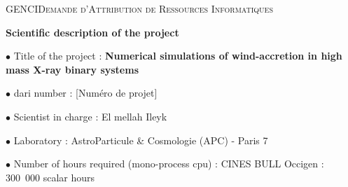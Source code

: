 \documentclass[
    a4paper, 
    12pt, onecolumn,
]{article}
\newcommand{\rubrique}{\bigskip \noindent $\bullet$ }
\begin{document}


 
\noindent GENCI\hfill \textsc{Demande d'Attribution de Ressources Informatiques}

\begin{center}
\Large  \bf
Scientific description of the project
\end{center}
\bigskip

\rubrique Title of the project : {\bf Numerical simulations of wind-accretion in \hspace*{4.42cm} high mass X-ray binary systems}

\rubrique  {\sc dari} number :
\hfill
[Num\'ero de projet]

\rubrique  Scientist in charge : 
\hfill
E{\sc l mellah} Ileyk


\rubrique Laboratory :  
\hfill
AstroParticule \& Cosmologie (APC) - Paris 7


\rubrique  Number of hours required (mono-process {\sc cpu}) :
     \newline CINES BULL Occigen      : \hfill  300\ 000 scalar hours
\end{document}
